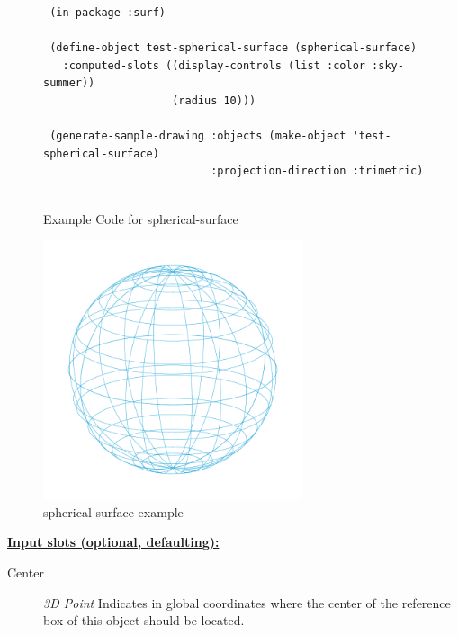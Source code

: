 \documentclass [11pt]{book}
\begin{document}
\begin{itemize}
\begin{figure}
\begin{lrbox}{\boxedverb}
\begin{minipage}{\linewidth}
{\begin{verbatim}
 (in-package :surf)

 (define-object test-spherical-surface (spherical-surface)
   :computed-slots ((display-controls (list :color :sky-summer))
                    (radius 10)))

 (generate-sample-drawing :objects (make-object 'test-spherical-surface)
                          :projection-direction :trimetric)


\end{verbatim}}
\end{minipage}
\end{lrbox}
\fbox{\usebox{\boxedverb}}

\caption{Example Code for spherical-surface}

\label{fig:example-code-spherical-surface}

\end{figure}

\begin{figure}
\begin{center}
\includegraphics[width=3in,height=3in]{../images/example-spherical-surface.pdf}
\end{center}

\caption{spherical-surface example}

\label{fig:spherical-surface}

\end{figure}





\textbf{
\underline{Input slots (optional, defaulting):}}

\begin{description}

\item [Center]
\emph{3D Point} Indicates in global coordinates where the center of the reference
box of this object should be located.



\end{description}
\end{itemize}
\end{document}
